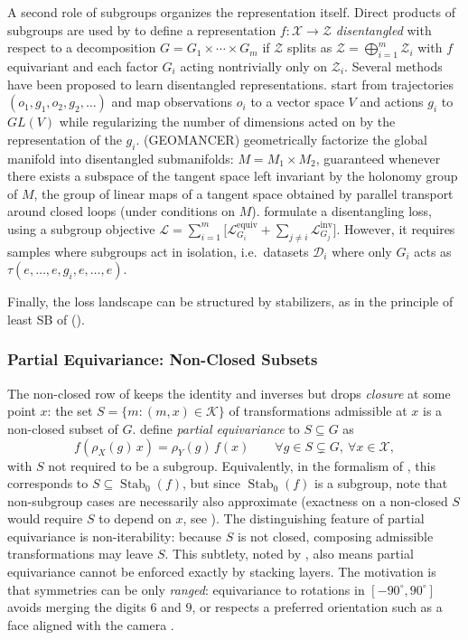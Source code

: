 \documentclass[mathematics,review,submit,moreauthors]{Definitions/mdpi}
\begin{document}
A second role of subgroups organizes the representation itself.
Direct products of subgroups are used by \citet{higgins2018} to define a representation $f\colon \mathcal{X}\to \mathcal{Z}$ \emph{disentangled} with respect to a decomposition $G=G_1\times\cdots\times G_m$ if $\mathcal{Z}$ splits as $\mathcal{Z}=\bigoplus_{i=1}^m \mathcal{Z}_i$ with $f$ equivariant and each factor $G_i$ acting nontrivially only on $\mathcal{Z}_i$.
Several methods have been proposed to learn disentangled representations.
\citet{quessard2020anips} start from trajectories $(o_1, g_1, o_2, g_2, \dots)$ and map observations $o_i$ to a vector space $V$ and actions $g_i$ to $GL(V)$ while regularizing the number of dimensions acted on by the representation of the $g_i$.
\citet{pfau2020anips} (GEOMANCER) geometrically factorize the global manifold into disentangled submanifolds: $M=M_1\times M_2$, guaranteed whenever there exists a subspace of the tangent space left invariant by the holonomy group of $M$, the group of linear maps of a tangent space obtained by parallel transport around closed loops (under conditions on $M$).
\citet{shakerinava2022anips} formulate a disentangling loss, using a subgroup objective $\mathcal{L}=\sum_{i=1}^{m} \big[\mathcal{L}_{G_i}^{\mathrm{equiv}} + \sum_{j\neq i} \mathcal{L}_{G_j}^{\mathrm{inv}}\big]$.
However, it requires samples where subgroups act in isolation, i.e.\ datasets $\mathcal{D}_i$ where only $G_i$ acts as $\tau (e, \dots, e, g_i, e, \dots, e)$.

Finally, the loss landscape can be structured by stabilizers, as in the principle of least SB of \citet{arjevani2023} ().

\subsubsection{Partial Equivariance: Non-Closed Subsets}\label{sec:non-closed-subsets}
The non-closed row of  keeps the identity and inverses but drops \emph{closure} at some point $x$: the set $S=\{m:(m,x)\in\mathcal K\}$ of transformations admissible at $x$ is a non-closed subset of $G$.
\citet{romero2023} define \emph{partial equivariance} to $S\subseteq G$ as
$$f(\rho_X(g)\,x)=\rho_Y(g)\,f(x)\qquad \forall g\in S\subsetneq G,\ \forall x\in \mathcal{X},$$
with $S$ not required to be a subgroup.
Equivalently, in the formalism of \citet{petrache2023}, this corresponds to $S\subseteq\operatorname{Stab}_0(f)$, but since $\operatorname{Stab}_0(f)$ is a subgroup, \citet{romero2023} note that non-subgroup cases are necessarily also approximate (exactness on a non-closed $S$ would require $S$ to depend on $x$, see ).
The distinguishing feature of partial equivariance is non-iterability: because $S$ is not closed, composing admissible transformations may leave $S$.
This subtlety, noted by \citet{romero2023}, also means partial equivariance cannot be enforced exactly by stacking layers.
The motivation is that symmetries can be only \emph{ranged}: equivariance to rotations in $[-90^\circ,90^\circ]$ avoids merging the digits $6$ and $9$, or respects a preferred orientation such as a face aligned with the camera \citep{romero2023}.
\end{document}
